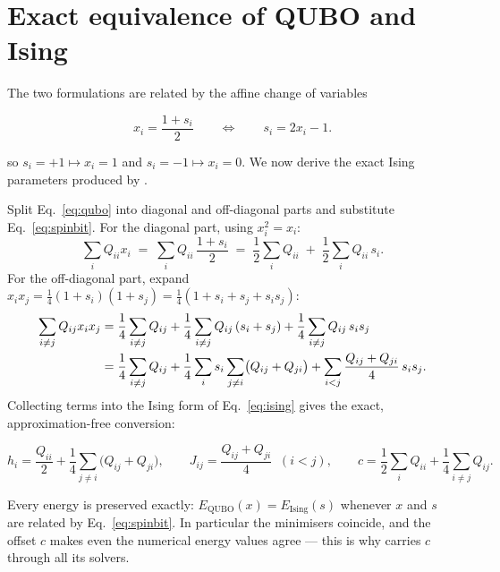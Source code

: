 \section{Exact equivalence of QUBO and Ising}
\label{sec:qubo-ising}

The two formulations are related by the affine change of variables

\begin{keyeq}
\begin{equation}
x_i=\frac{1+s_i}{2}
\qquad\Longleftrightarrow\qquad
s_i = 2x_i-1 .
\label{eq:spinbit}
\end{equation}
\end{keyeq}

\noindent
so $s_i=+1\mapsto x_i=1$ and $s_i=-1\mapsto x_i=0$. We now derive the exact
Ising parameters produced by .

Split Eq.~\eqref{eq:qubo} into diagonal and off-diagonal parts and substitute
Eq.~\eqref{eq:spinbit}. For the diagonal part, using $x_i^2=x_i$:
\begin{equation}
\sum_i Q_{ii}x_i \;=\; \sum_i Q_{ii}\,\frac{1+s_i}{2}
\;=\;\frac12\sum_i Q_{ii} \;+\; \frac12\sum_i Q_{ii}\,s_i .
\end{equation}
For the off-diagonal part, expand
$x_ix_j=\tfrac14(1+s_i)(1+s_j)=\tfrac14\left(1+s_i+s_j+s_is_j\right)$:
\begin{align}
\sum_{i\neq j}Q_{ij}x_ix_j
&=\frac14\sum_{i\neq j}Q_{ij}
 +\frac14\sum_{i\neq j}Q_{ij}\,(s_i+s_j)
 +\frac14\sum_{i\neq j}Q_{ij}\,s_is_j \notag\\
&=\frac14\sum_{i\neq j}Q_{ij}
 +\frac14\sum_i s_i \sum_{j\neq i}\bigl(Q_{ij}+Q_{ji}\bigr)
 +\sum_{i<j}\frac{Q_{ij}+Q_{ji}}{4}\, s_is_j .
\end{align}
Collecting terms into the Ising form of Eq.~\eqref{eq:ising} gives the exact,
approximation-free conversion:

\begin{keyeq}
\begin{equation}
h_i=\frac{Q_{ii}}{2}+\frac14\sum_{j\neq i}\bigl(Q_{ij}+Q_{ji}\bigr),
\qquad
J_{ij}=\frac{Q_{ij}+Q_{ji}}{4}\;\;(i<j),
\qquad
c=\frac12\sum_i Q_{ii}+\frac14\sum_{i\neq j}Q_{ij}.
\label{eq:qubo2ising}
\end{equation}
\end{keyeq}

Every energy is preserved exactly: $E_{\mathrm{QUBO}}(x)=E_{\mathrm{Ising}}(s)$
whenever $x$ and $s$ are related by Eq.~\eqref{eq:spinbit}. In particular the
minimisers coincide, and the offset $c$ makes even the numerical energy
values agree --- this is why \qv{} carries $c$ through all its solvers.

